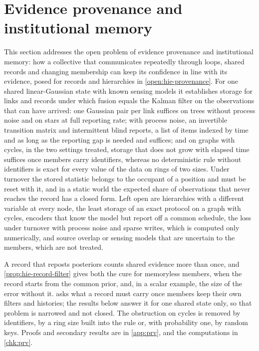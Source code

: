 \section{Evidence provenance and institutional memory}\label{sec:prv}

This section addresses the open problem of evidence provenance and institutional memory: how a collective that communicates repeatedly through loops, shared records and changing membership can keep its confidence in line with its evidence, posed for records and hierarchies in \cref{open:hie-provenance}. For one shared linear-Gaussian state with known sensing models it establishes storage for links and records under which fusion equals the Kalman filter on the observations that can have arrived: one Gaussian pair per link suffices on trees without process noise and on stars at full reporting rate; with process noise, an invertible transition matrix and intermittent blind reports, a list of items indexed by time and as long as the reporting gap is needed and suffices; and on graphs with cycles, in the two settings treated, storage that does not grow with elapsed time suffices once members carry identifiers, whereas no deterministic rule without identifiers is exact for every value of the data on rings of two sizes. Under turnover the stored statistic belongs to the occupant of a position and must be reset with it, and in a static world the expected share of observations that never reaches the record has a closed form. Left open are hierarchies with a different variable at every node, the least storage of an exact protocol on a graph with cycles, encoders that know the model but report off a common schedule, the loss under turnover with process noise and sparse writes, which is computed only numerically, and source overlap or sensing models that are uncertain to the members, which are not treated.

A record that reposts posteriors counts shared evidence more than once, and \cref{prop:hie-record-filter} gives both the cure for memoryless members, when the record starts from the common prior, and, in a scalar example, the size of the error without it.  asks what a record must carry once members keep their own filters and histories; the results below answer it for one shared state only, so that problem is narrowed and not closed. The obstruction on cycles is removed by identifiers, by a ring size built into the rule or, with probability one, by random keys. Proofs and secondary results are in \cref{app:prv}, and the computations in \cref{chk:prv}.

